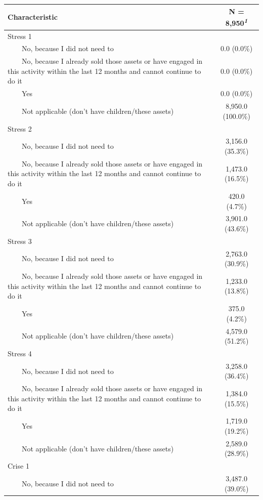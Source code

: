\documentclass[
]{article}
\begin{document}
\begin{table}[!t]
\fontsize{9.8pt}{11.7pt}\selectfont
\begin{tabular*}{\linewidth}{@{\extracolsep{\fill}}lc}
\toprule
\textbf{Characteristic} & \textbf{N = 8,950}\textsuperscript{\textit{1}} \\ 
\midrule\addlinespace[2.5pt]
Stress 1 &  \\ 
    No, because I did not need to & 0.0 (0.0\%) \\ 
    No, because I already sold those assets or have engaged in this activity within the last 12 months and cannot continue to do it & 0.0 (0.0\%) \\ 
    Yes & 0.0 (0.0\%) \\ 
    Not applicable (don't have children/these assets) & 8,950.0 (100.0\%) \\ 
Stress 2 &  \\ 
    No, because I did not need to & 3,156.0 (35.3\%) \\ 
    No, because I already sold those assets or have engaged in this activity within the last 12 months and cannot continue to do it & 1,473.0 (16.5\%) \\ 
    Yes & 420.0 (4.7\%) \\ 
    Not applicable (don't have children/these assets) & 3,901.0 (43.6\%) \\ 
Stress 3 &  \\ 
    No, because I did not need to & 2,763.0 (30.9\%) \\ 
    No, because I already sold those assets or have engaged in this activity within the last 12 months and cannot continue to do it & 1,233.0 (13.8\%) \\ 
    Yes & 375.0 (4.2\%) \\ 
    Not applicable (don't have children/these assets) & 4,579.0 (51.2\%) \\ 
Stress 4 &  \\ 
    No, because I did not need to & 3,258.0 (36.4\%) \\ 
    No, because I already sold those assets or have engaged in this activity within the last 12 months and cannot continue to do it & 1,384.0 (15.5\%) \\ 
    Yes & 1,719.0 (19.2\%) \\ 
    Not applicable (don't have children/these assets) & 2,589.0 (28.9\%) \\ 
Crise 1 &  \\ 
    No, because I did not need to & 3,487.0 (39.0\%) \\ 

\end{tabular*}
\end{table}
\end{document}
